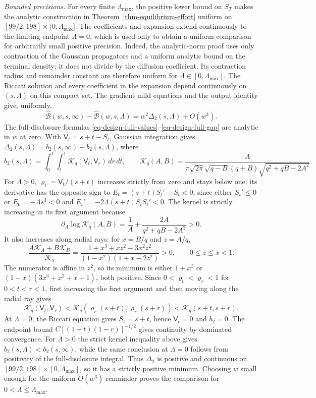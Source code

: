 \documentclass[mnsc]{informs3}
\begin{document}
\begin{APPENDICES}
{\emph{Bounded precisions.}
For every finite ${\Lambda_{\max}}$, the positive lower bound on $S_T$ makes
the analytic construction in Theorem~\ref{thm-equilibrium-effort}
uniform on $[99/2,198]\times(0,{\Lambda_{\max}}]$. The coefficients and expansion
extend continuously to the limiting endpoint $\Lambda=0$, which is used only
to obtain a uniform comparison for arbitrarily small positive precision.
Indeed, the analytic-norm proof uses only contraction of the Gaussian
propagators and a uniform analytic bound on the terminal density; it does
not divide by the diffusion coefficient. Its contraction radius and
remainder constant are therefore uniform for $\Lambda\in[0,{\Lambda_{\max}}]$. The Riccati
solution and every coefficient in the expansion depend continuously on
$(s,\Lambda)$ on this compact set.
The gradient mild equations and the output identity give, uniformly,
\[
\widehat{\mathcal B}(w,s,\infty)-\widehat{\mathcal B}(w,s,\Lambda)
=w^2\Delta_2(s,\Lambda)+O(w^3).
\]
The full-disclosure formulas \eqref{eq-design-full-values}--\eqref{eq-design-full-gap}
are analytic in $w$ at zero.
With $\mathsf V_t=s+t-S_t$, Gaussian integration gives
$\Delta_2(s,\Lambda)=b_2(s,\infty)-b_2(s,\Lambda)$, where
\[
b_2(s,\Lambda)=\int_0^1\int_t^1 \mathscr K_q(\mathsf V_t,\mathsf V_r)\,dr\,dt,\qquad
\mathscr K_q(A,B)=\frac{A}{\pi\sqrt{2\pi}\sqrt{q-B}(q+B)
\sqrt{q^2+qB-2A^2}}.
\]
For $\Lambda>0$, $\varrho_t=\mathsf V_t/(s+t)$ increases strictly from zero
and stays below one: its derivative has the opposite sign to
$E_t=(s+t)S_t'-S_t<0$, since either $S_t'\leq0$ or
$E_0=-\Lambda s^3<0$ and $E_t'=-2\Lambda(s+t)S_tS_t'<0$.
The kernel is strictly increasing in its first argument because
\[
\partial_A\log \mathscr K_q(A,B)
=\frac1A+\frac{2A}{q^2+qB-2A^2}>0.
\]
It also increases along radial rays: for
$x=B/q$ and $z=A/q$,
\[
\frac{A\mathscr K_A+B\mathscr K_B}{\mathscr K_q}
=\frac{1+x^3+xz^2-3x^2z^2}
{(1-x^2)(1+x-2z^2)}>0,\qquad 0\leq z\leq x<1.
\]
The numerator is affine in $z^2$, so its minimum is either
$1+x^3$ or $(1-x)(3x^3+x^2+x+1)$, both positive.
Since $0<\varrho_t<\varrho_r<1$ for $0<t<r<1$, first increasing the
first argument and then moving along the radial ray gives
\[
\mathscr K_q(\mathsf V_t,\mathsf V_r)
<\mathscr K_q\!\left(\varrho_r(s+t),\varrho_r(s+r)\right)
<\mathscr K_q(s+t,s+r).
\]
At $\Lambda=0$, the Riccati equation gives $S_t=s+t$, hence $\mathsf V_t=0$ and
$b_2=0$. The endpoint bound
$C[(1-t)(1-r)]^{-1/2}$ gives continuity by dominated convergence.
For $\Lambda>0$ the strict kernel inequality above gives
$b_2(s,\Lambda)<b_2(s,\infty)$, while the same conclusion at $\Lambda=0$
follows from positivity of the full-disclosure integral. Thus
$\Delta_2$ is positive and continuous on
$[99/2,198]\times[0,{\Lambda_{\max}}]$, so it has a strictly positive minimum. Choosing
$w$ small enough for the uniform $O(w^3)$ remainder proves the comparison
for $0<\Lambda\leq {\Lambda_{\max}}$.

}
\end{APPENDICES}
\end{document}
